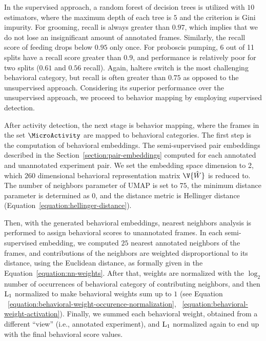 In the supervised approach, a random forest of decision trees \citep{breiman_random_2001} is utilized with $10$ estimators, where the maximum depth of each tree is $5$ and the criterion is Gini impurity.
For grooming, recall is always greater than $0.97$, which implies that we do not lose an insignificant amount of annotated frames.
Similarly, the recall score of feeding drops below $0.95$ only once.
For proboscis pumping, 6 out of 11 splits have a recall score greater than $0.9$, and performance is relatively poor for two splits ($0.61$ and $0.56$ recall).
Again, haltere switch is the most challenging behavioral category, but recall is often greater than $0.75$ as opposed to the unsupervised approach.
Considering its superior performance over the unsupervised approach, we proceed to behavior mapping by employing supervised detection.

After activity detection, the next stage is behavior mapping, where the frames in the set $\MicroActivity$ are mapped to behavioral categories.
The first step is the computation of behavioral embeddings.
The semi-supervised pair embeddings described in the Section~\ref{section:pair-embeddings} computed for each annotated and unannotated experiment pair.
We set the embedding space dimension to 2, which $260$ dimensional behavioral representation matrix $\V{\hat{W}}$ is reduced to.
The number of neighbors parameter of UMAP is set to $75$, the minimum distance parameter is determined as $0$, and the distance metric is Hellinger distance (Equation~\ref{equation:hellinger-distance}).

Then, with the generated behavioral embeddings, nearest neighbors analysis is performed to assign behavioral scores to unannotated frames.
In each semi-supervised embedding, we computed $25$ nearest annotated neighbors of the frames, and contributions of the neighbors are weighted disproportional to its distance, using the Euclidean distance, as formally given in the Equation~\ref{equation:nn-weights}.
After that, weights are normalized with the $\log_2$ number of occurrences of behavioral category of contributing neighbors, and then $\textnormal{L}_1$ normalized to make behavioral weights sum up to $1$ (see Equation ~\ref{equation:behavioral-weight-occurence-normalization}, ~\ref{equation:behavioral-weight-activation}). Finally, we summed each behavioral weight, obtained from a different ``view'' (i.e., annotated experiment), and $\textnormal{L}_1$ normalized again to end up with the final behavioral score values.

